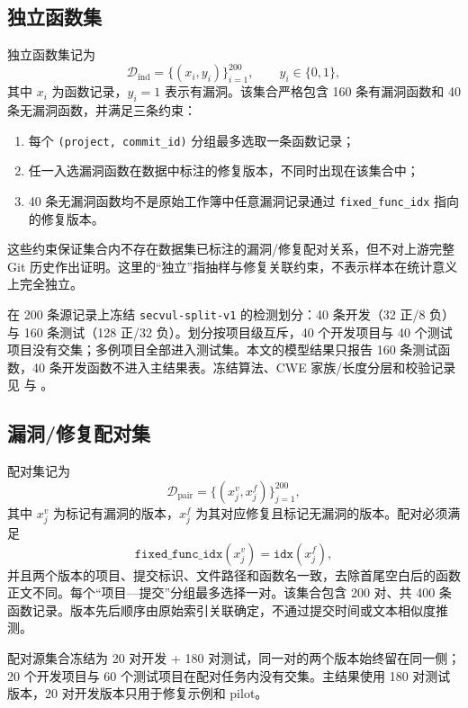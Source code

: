 \documentclass[conference]{IEEEtran}
\newcommand{\Dind}{\mathcal{D}_{\mathrm{ind}}}
\newcommand{\Dpair}{\mathcal{D}_{\mathrm{pair}}}
\begin{document}
\subsection{独立函数集}
独立函数集记为
\begin{equation}
\Dind=\{(x_i,y_i)\}_{i=1}^{200},\qquad y_i\in\{0,1\},
\end{equation}
其中 $x_i$ 为函数记录，$y_i=1$ 表示有漏洞。该集合严格包含 160 条有漏洞函数和 40 条无漏洞函数，并满足三条约束：
\begin{enumerate}
    \item 每个 \texttt{(project, commit\_id)} 分组最多选取一条函数记录；
    \item 任一入选漏洞函数在数据中标注的修复版本，不同时出现在该集合中；
    \item 40 条无漏洞函数均不是原始工作簿中任意漏洞记录通过 \texttt{fixed\_func\_idx} 指向的修复版本。
\end{enumerate}
这些约束保证集合内不存在数据集已标注的漏洞/修复配对关系，但不对上游完整 Git 历史作出证明。这里的“独立”指抽样与修复关联约束，不表示样本在统计意义上完全独立。

在 200 条源记录上冻结 \texttt{secvul-split-v1} 的检测划分：40 条开发（32 正/8 负）与 160 条测试（128 正/32 负）。划分按项目级互斥，40 个开发项目与 40 个测试项目没有交集；多例项目全部进入测试集。本文的模型结果只报告 160 条测试函数，40 条开发函数不进入主结果表。冻结算法、CWE 家族/长度分层和校验记录见  与 。

\subsection{漏洞/修复配对集}
配对集记为
\begin{equation}
\Dpair=\{(x_j^{v},x_j^{f})\}_{j=1}^{200},
\end{equation}
其中 $x_j^{v}$ 为标记有漏洞的版本，$x_j^{f}$ 为其对应修复且标记无漏洞的版本。配对必须满足
\begin{equation}
\texttt{fixed\_func\_idx}(x_j^{v})=\texttt{idx}(x_j^{f}),
\end{equation}
并且两个版本的项目、提交标识、文件路径和函数名一致，去除首尾空白后的函数正文不同。每个“项目—提交”分组最多选择一对。该集合包含 200 对、共 400 条函数记录。版本先后顺序由原始索引关联确定，不通过提交时间或文本相似度推测。

配对源集合冻结为 20 对开发 + 180 对测试，同一对的两个版本始终留在同一侧；20 个开发项目与 60 个测试项目在配对任务内没有交集。主结果使用 180 对测试版本，20 对开发版本只用于修复示例和 pilot。
\end{document}
